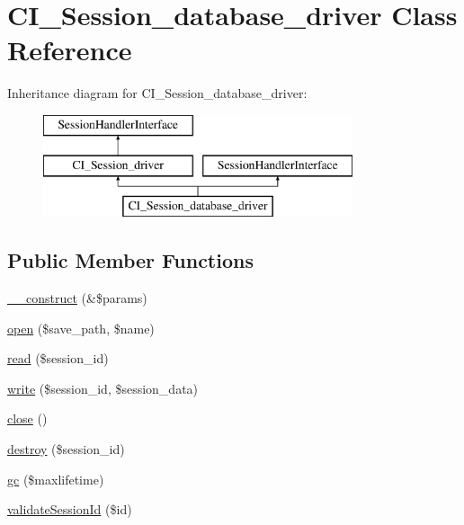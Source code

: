 \hypertarget{class_c_i___session__database__driver}{}\section{C\+I\+\_\+\+Session\+\_\+database\+\_\+driver Class Reference}
\label{class_c_i___session__database__driver}
Inheritance diagram for C\+I\+\_\+\+Session\+\_\+database\+\_\+driver\+:\begin{figure}[H]
\begin{center}
\leavevmode
\includegraphics[height=3.000000cm]{class_c_i___session__database__driver}
\end{center}
\end{figure}
\subsection*{Public Member Functions}
\begin{DoxyCompactItemize}
\item 
\mbox{\hyperlink{class_c_i___session__database__driver_a4f63614a226b138ec1dc68ec27fa4b14}{\+\_\+\+\_\+construct}} (\&\$params)
\item 
\mbox{\hyperlink{class_c_i___session__database__driver_a8d72222ab3525a8d6316c5b7c6b5571c}{open}} (\$save\+\_\+path, \$name)
\item 
\mbox{\hyperlink{class_c_i___session__database__driver_a7e6f41d5d64b4dcbf1b924712bf89ce1}{read}} (\$session\+\_\+id)
\item 
\mbox{\hyperlink{class_c_i___session__database__driver_a9d04ba75ca5700ae3e44b156d2df1447}{write}} (\$session\+\_\+id, \$session\+\_\+data)
\item 
\mbox{\hyperlink{class_c_i___session__database__driver_a371a8fd53fbc3e522b862677678bc99c}{close}} ()
\item 
\mbox{\hyperlink{class_c_i___session__database__driver_a7e820c391e772eca26afffe2a841ee8c}{destroy}} (\$session\+\_\+id)
\item 
\mbox{\hyperlink{class_c_i___session__database__driver_ac3b48d4f20b1e205cd4934eaecdfd8e9}{gc}} (\$maxlifetime)
\item 
\mbox{\hyperlink{class_c_i___session__database__driver_ab810ace1dcf710cd32ca3e5006499340}{validate\+Session\+Id}} (\$id)
\end{DoxyCompactItemize}

